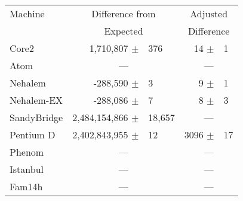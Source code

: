 \begin{tabular}{|l||rl|rl|}

\hline
Machine   & \multicolumn{2}{c|}{Difference from} & \multicolumn{2}{c|}{Adjusted} \\
          & \multicolumn{2}{c|}{Expected}        & \multicolumn{2}{c|}{Difference} \\
\hline
\hline

Core2          &  1,710,807  $\pm$ & 376       &        14   $\pm$ & 1  \\
\hline
Atom           & \multicolumn{2}{c|}{---} &  \multicolumn{2}{c|}{---} \\
\hline
Nehalem        & -288,590    $\pm$ & 3          &         9   $\pm$ & 1  \\
\hline
Nehalem-EX     & -288,086    $\pm$ & 7          &         8   $\pm$ & 3  \\
\hline
SandyBridge    & 2,484,154,866 $\pm$ & 18,657    &  \multicolumn{2}{c|}{---} \\
\hline
Pentium D      & 2,402,843,955 $\pm$ & 12       &      3096   $\pm$ & 17 \\
\hline
Phenom         & \multicolumn{2}{c|}{---} &  \multicolumn{2}{c|}{---} \\
\hline
Istanbul       & \multicolumn{2}{c|}{---} &  \multicolumn{2}{c|}{---} \\
\hline
Fam14h         & \multicolumn{2}{c|}{---} &  \multicolumn{2}{c|}{---} \\
\hline
\end{tabular}
%

